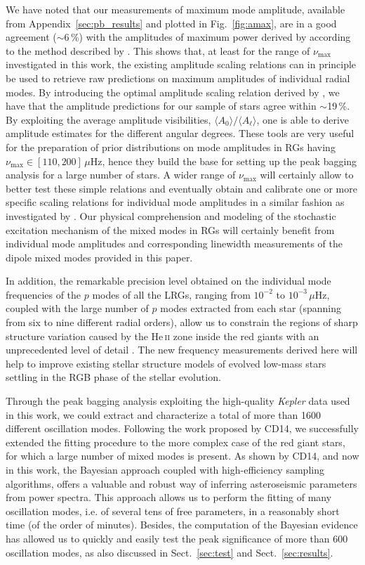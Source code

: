 \documentclass[structabstract]{aa}
\newcommand{\kepler}{\textit{Kepler} }
\newcommand{\numax}{\nu_\mathrm{max}}
\newcommand{\muhz}{$\mu$Hz}
\newcommand{\he}{He\textsc{\,\large ii}}
\begin{document}
We have noted that our measurements of maximum mode amplitude, available from Appendix~\ref{sec:pb_results} and plotted in Fig.~\ref{fig:amax}, are in a good agreement ($\sim 6$\,\%) with the amplitudes of maximum power derived by \cite{Huber11} according to the method described by \cite{K05,K08}. This shows that, at least for the range of $\numax$ investigated in this work, the existing amplitude scaling relations can in principle be used to retrieve raw predictions on maximum amplitudes of individual radial modes. By introducing the optimal amplitude scaling relation derived by \cite{Corsaro13}, we have that the amplitude predictions for our sample of stars agree within $\sim$19\,\%. By exploiting the average amplitude visibilities, $\langle A_0 \rangle / \langle A_{\ell} \rangle$, one is able to derive amplitude estimates for the different angular degrees. These tools are very useful for the preparation of prior distributions on mode amplitudes in RGs having $\numax \in \left[110, 200 \right]$\,\muhz, hence they build the base for setting up the peak bagging analysis for a large number of stars. A wider range of $\numax$ will certainly allow to better test these simple relations and eventually obtain and calibrate one or more specific scaling relations for individual mode amplitudes in a similar fashion as investigated by \cite{Corsaro13}. Our physical comprehension and modeling of the stochastic excitation mechanism of the mixed modes in RGs \citep[e.g. see][]{Grosjean14} will certainly benefit from individual mode amplitudes and corresponding linewidth measurements of the dipole mixed modes provided in this paper.

In addition, the remarkable precision level obtained on the individual mode frequencies of the $p$ modes of all the LRGs, ranging from $10^{-2}$ to $10^{-3}$\,\muhz, coupled with the large number of $p$ modes extracted from each star (spanning from six to nine different radial orders), allow us to constrain the regions of sharp structure variation caused by the \he\,\,zone inside the red giants with an unprecedented level of detail \citep[see][for more details]{Corsaro15letter}. The new frequency measurements derived here will help to improve existing stellar structure models of evolved low-mass stars settling in the RGB phase of the stellar evolution.

Through the peak bagging analysis exploiting the high-quality \kepler data used in this work, we could extract and characterize a total of more than 1600 different oscillation modes. Following the work proposed by CD14, we successfully extended the fitting procedure to the more complex case of the red giant stars, for which a large number of mixed modes is present. As shown by CD14, and now in this work, the Bayesian approach coupled with high-efficiency sampling algorithms, offers a valuable and robust way of inferring asteroseismic parameters from power spectra. This approach allows us to perform the fitting of many oscillation modes, i.e. of several tens of free parameters, in a reasonably short time (of the order of minutes). Besides, the computation of the Bayesian evidence has allowed us to quickly and easily test the peak significance of more than 600 oscillation modes, as also discussed in Sect.~\ref{sec:test} and Sect.~\ref{sec:results}.
\end{document}
